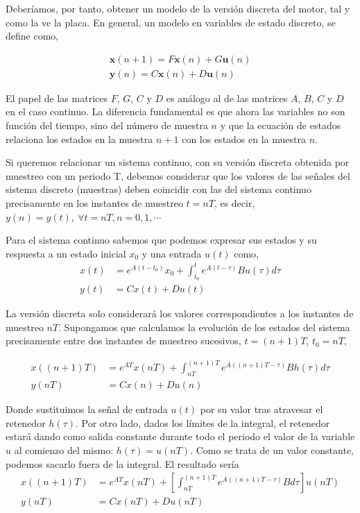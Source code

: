 \documentclass[10pt,a4paper]{report}
\begin{document}
Deberíamos, por tanto, obtener un modelo de la versión discreta del motor, tal y como la ve la placa.  En general, un modelo en variables de estado discreto, se define como,

 \begin{align}
\mathbf{x}(n+1) = F\mathbf{x}(n) + G\mathbf{u}(n) \label{eq42}\\
\mathbf{y}(n)  = C\mathbf{x}(n)+D\mathbf{u}(n) \label{eq43}
\end{align} 

El papel de las matrices $F$, $G$, $C$ y $D$ es análogo al de las matrices $A$, $B$, $C$ y $D$ en el caso continuo. La diferencia fundamental es que ahora las variables no son función del tiempo, sino del número de muestra $n$ y que la ecuación de estados relaciona los estados en la muestra $n+1$ con los estados en la muestra $n$.

Si queremos relacionar un sistema continuo, con su versión discreta obtenida por muestreo con un periodo T, debemos considerar que los valores de las señales del sistema discreto (muestras) deben coincidir con las del sistema continuo precisamente en los instantes de muestreo $t = nT$, es decir, $y(n) = y(t),\ \forall t = nT, n = 0,1,\cdots$ 

Para el sistema continuo sabemos que podemos expresar sus estados y su respuesta a un estado inicial $x_0$ y una entrada $u(t)$ como,
\begin{align}
x(t) &= e^{A(t-t_0)}x_0 + \int_{t_0}^t e^{A(t-\tau)}Bu(\tau)d\tau\\
y(t) &= Cx(t) + Du(t)
\end{align}

La versión discreta solo considerará los valores correspondientes a los instantes de muestreo $nT$. Supongamos que calculamos la evolución de los estados del sistema precisamente entre dos instantes de muestreo sucesivos, $t=(n+1)T$, $t_0=nT$,

\begin{align}
x((n+1)T) &= e^{AT}x(nT) + \int_{nT}^{(n+1)T} e^{A((n+1)T-\tau)}Bh(\tau)d\tau\\
y(nT) &= Cx(n) + Du(n)
\end{align}

Donde sustituimos la señal de entrada $u(t)$ por su valor tras atravesar el retenedor $h(\tau)$. Por otro lado, dados los límites de la integral, el retenedor estará dando como salida constante durante todo el periodo el valor de la variable $u$ al comienzo del mismo: $h(\tau) = u(nT)$. Como se trata de un valor constante, podemos sacarlo fuera de la integral. El resultado sería
\begin{align}
x((n+1)T) &= e^{AT}x(nT) + \left[\int_{nT}^{(n+1)T} e^{A((n+1)T-\tau)}Bd\tau\right] u(nT) \label{eq48}\\ 
y(nT) &= Cx(nT) + Du(nT) \label{eq49}
\end{align}
\end{document}

